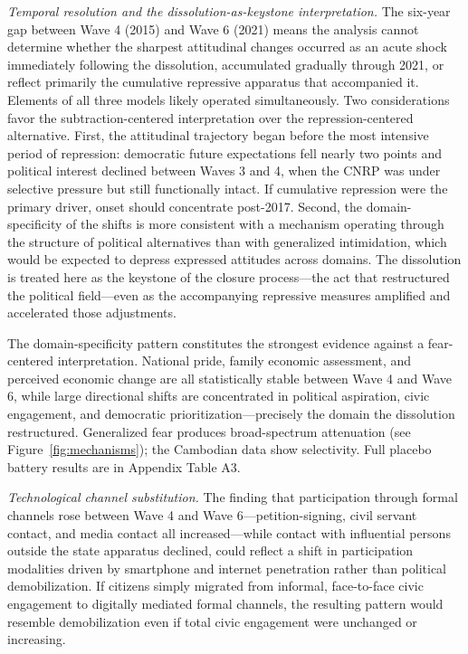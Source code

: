 \documentclass[
  12pt,
  letterpaper]{article}
\begin{document}
\emph{Temporal resolution and the dissolution-as-keystone
interpretation.} The six-year gap between Wave 4 (2015) and Wave 6
(2021) means the analysis cannot determine whether the sharpest
attitudinal changes occurred as an acute shock immediately following the
dissolution, accumulated gradually through 2021, or reflect primarily
the cumulative repressive apparatus that accompanied it. Elements of all
three models likely operated simultaneously. Two considerations favor
the subtraction-centered interpretation over the repression-centered
alternative. First, the attitudinal trajectory began before the most
intensive period of repression: democratic future expectations fell
nearly two points and political interest declined between Waves 3 and 4,
when the CNRP was under selective pressure but still functionally
intact. If cumulative repression were the primary driver, onset should
concentrate post-2017. Second, the domain-specificity of the shifts is
more consistent with a mechanism operating through the structure of
political alternatives than with generalized intimidation, which would
be expected to depress expressed attitudes across domains. The
dissolution is treated here as the keystone of the closure process---the
act that restructured the political field---even as the accompanying
repressive measures amplified and accelerated those adjustments.

The domain-specificity pattern constitutes the strongest evidence
against a fear-centered interpretation. National pride, family economic
assessment, and perceived economic change are all statistically stable
between Wave 4 and Wave 6, while large directional shifts are
concentrated in political aspiration, civic engagement, and democratic
prioritization---precisely the domain the dissolution restructured.
Generalized fear produces broad-spectrum attenuation (see
Figure~\ref{fig:mechanisms}); the Cambodian data show selectivity. Full
placebo battery results are in Appendix Table A3.

\emph{Technological channel substitution.} The finding that
participation through formal channels rose between Wave 4 and Wave
6---petition-signing, civil servant contact, and media contact all
increased---while contact with influential persons outside the state
apparatus declined, could reflect a shift in participation modalities
driven by smartphone and internet penetration rather than political
demobilization. If citizens simply migrated from informal, face-to-face
civic engagement to digitally mediated formal channels, the resulting
pattern would resemble demobilization even if total civic engagement
were unchanged or increasing.
\end{document}
